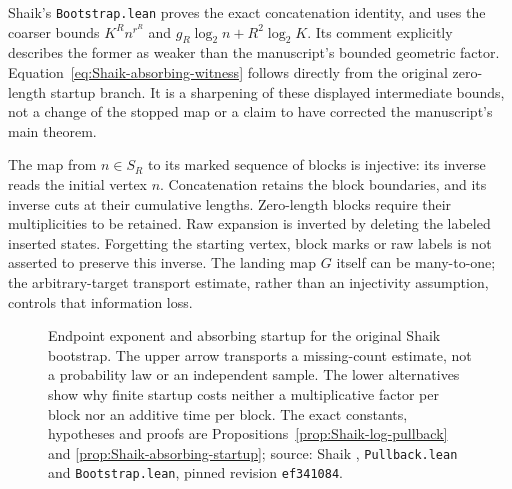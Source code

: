 Shaik's \texttt{Bootstrap.lean} proves the exact concatenation identity,
and uses the coarser bounds \(K^R n^{r^R}\) and
\(g_R\log_2n+R^2\log_2K\). Its comment explicitly describes the former
as weaker than the manuscript's bounded geometric factor.
Equation~\eqref{eq:Shaik-absorbing-witness} follows directly from the
original zero-length startup branch. It is a sharpening of these
displayed intermediate bounds, not a change of the stopped map or
a claim to have corrected the manuscript's main theorem.

The map from \(n\in S_R\) to its marked sequence of blocks is injective:
its inverse reads the initial vertex \(n\).
Concatenation retains the block boundaries, and its inverse cuts at
their cumulative lengths. Zero-length blocks require their multiplicities
to be retained. Raw expansion is inverted by deleting the labeled
inserted states. Forgetting the starting vertex, block marks or raw
labels is not asserted to preserve this inverse.
The landing map \(G\) itself can be many-to-one; the arbitrary-target
transport estimate, rather than an injectivity assumption, controls
that information loss.

\begin{figure}[ht]
\centering
{}
\caption{Endpoint exponent and absorbing startup for the original
Shaik bootstrap. The upper arrow transports a missing-count estimate,
not a probability law or an independent sample.
The lower alternatives show why finite startup costs neither a
multiplicative factor per block nor an additive time per block.
The exact constants, hypotheses and proofs are
Propositions~\ref{prop:Shaik-log-pullback} and
\ref{prop:Shaik-absorbing-startup}; source:
Shaik \cite{Shaik2026v324}, \texttt{Pullback.lean} and
\texttt{Bootstrap.lean}, pinned revision \texttt{ef341084}.}
\end{figure}


